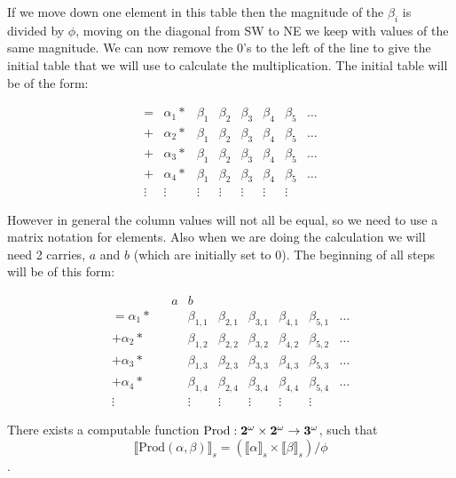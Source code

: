 \documentclass{cs4rep}
\begin{document}
If we move down one element in this table then the magnitude of the
$\beta_{i}$ is divided by $ \phi $, moving on the diagonal from SW to
NE we keep with values of the same magnitude. We can now remove the
0's to the left of the line to give the initial table that we will use
to calculate the multiplication. The initial table will be of the form:

\[ \begin{array}{cc|cccccc}
= & \alpha_{1} * & \beta_{1} & \beta_{2} & \beta_{3} & \beta_{4} & \beta_{5} & \ldots \\
+ & \alpha_{2} * & \beta_{1} & \beta_{2} & \beta_{3} & \beta_{4} & \beta_{5} & \ldots \\
+ & \alpha_{3} * & \beta_{1} & \beta_{2} & \beta_{3} & \beta_{4} & \beta_{5} & \ldots \\
+ & \alpha_{4} * & \beta_{1} & \beta_{2} & \beta_{3} & \beta_{4} & \beta_{5} & \ldots \\
\vdots & \vdots & \vdots & \vdots & \vdots & \vdots & \vdots
\end{array} \]

However in general the column values will not all be equal, so we need
to use a matrix notation for elements. Also when we are doing the
calculation we will need 2 carries, $a$ and $b$ (which are initially set
to 0). The beginning of all steps will be of this form:

\[ \begin{array}{ccc|cccccc}
& & a & b \\
= \alpha_{1} * & & & \beta_{1,1} & \beta_{2,1} & \beta_{3,1} & \beta_{4,1} & \beta_{5,1} & \ldots \\
+ \alpha_{2} * & & & \beta_{1,2} & \beta_{2,2} & \beta_{3,2} & \beta_{4,2} & \beta_{5,2} & \ldots \\
+ \alpha_{3} * & & & \beta_{1,3} & \beta_{2,3} & \beta_{3,3} & \beta_{4,3} & \beta_{5,3} & \ldots \\
+ \alpha_{4} * & & & \beta_{1,4} & \beta_{2,4} & \beta_{3,4} & \beta_{4,4} & \beta_{5,4} & \ldots \\
\vdots & & & \vdots & \vdots & \vdots & \vdots & \vdots
\end{array} \]


\begin{myprop}
  There exists a computable function $\mbox{Prod}:{\bf 2^{\omega} \times
    2^{\omega}} \rightarrow {\bf 3}^{\omega}$, such that \[ \llbracket
  \mbox{Prod}(\alpha, \beta ) \rrbracket_{s} = ( \llbracket \alpha
  \rrbracket_{s} \times \llbracket \beta \rrbracket_{s} ) / \phi \].
\end{myprop}
\end{document}
